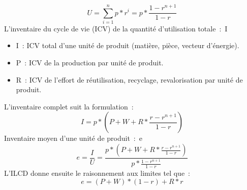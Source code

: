 {%
   \begin{equation}
   U = \sum_{i=1}^{n}p*r^i=p*\frac{1-r^{n+1}}{1-r}
   \end{equation}
   L'inventaire du cycle de vie (ICV) de la quantité d'utilisation totale~:~I
   \begin{itemize}
    \item I~: ICV total d'une unité de produit (matière, pièce, vecteur d'énergie). %
    \item P~: ICV de la production par unité de produit.
    \item R~: ICV de l'effort de réutilisation, recyclage, revalorisation par unité de produit.
   \end{itemize}

L'inventaire complet suit la formulation~:
  \begin{equation}
   I = p*(P+W+R*\frac{r-r^{n+1}}{1-r})
  \end{equation}
%   
   Inventaire moyen d'une unité de produit~:~e
  \begin{equation}
  e= \frac{I}{U}=\frac{p*(P+W+R*\frac{r-r^{n+1}}{1-r})}{p*\frac{1-r^{n+1}}{1-r}}
  \end{equation}
%   
L'ILCD donne ensuite le raisonnement aux limites tel que~:
  \begin{equation}
  e=(P+W)*(1-r)+R*r 
  \end{equation}

}
